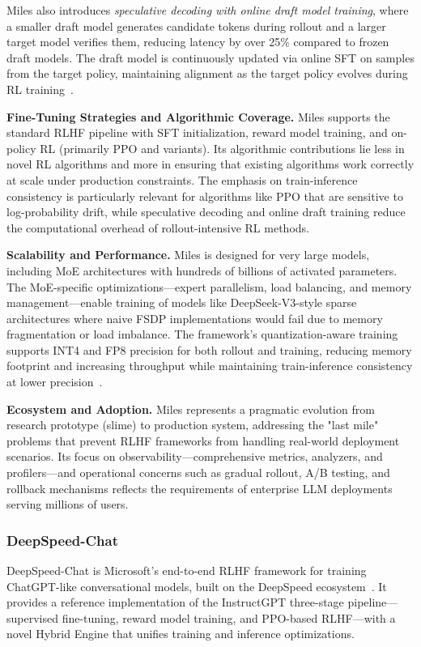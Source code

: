 \documentclass[conference]{IEEEtran}
\begin{document}
Miles also introduces \textit{speculative decoding with online draft model training}, where a smaller draft model generates candidate tokens during rollout and a larger target model verifies them, reducing latency by over 25\% compared to frozen draft models. The draft model is continuously updated via online SFT on samples from the target policy, maintaining alignment as the target policy evolves during RL training~\cite{miles-blog}.

\textbf{Fine-Tuning Strategies and Algorithmic Coverage.} Miles supports the standard RLHF pipeline with SFT initialization, reward model training, and on-policy RL (primarily PPO and variants). Its algorithmic contributions lie less in novel RL algorithms and more in ensuring that existing algorithms work correctly at scale under production constraints. The emphasis on train-inference consistency is particularly relevant for algorithms like PPO that are sensitive to log-probability drift, while speculative decoding and online draft training reduce the computational overhead of rollout-intensive RL methods.

\textbf{Scalability and Performance.} Miles is designed for very large models, including MoE architectures with hundreds of billions of activated parameters. The MoE-specific optimizations—expert parallelism, load balancing, and memory management—enable training of models like DeepSeek-V3-style sparse architectures where naive FSDP implementations would fail due to memory fragmentation or load imbalance. The framework's quantization-aware training supports INT4 and FP8 precision for both rollout and training, reducing memory footprint and increasing throughput while maintaining train-inference consistency at lower precision~\cite{miles-blog}.

\textbf{Ecosystem and Adoption.} Miles represents a pragmatic evolution from research prototype (slime) to production system, addressing the "last mile" problems that prevent RLHF frameworks from handling real-world deployment scenarios. Its focus on observability—comprehensive metrics, analyzers, and profilers—and operational concerns such as gradual rollout, A/B testing, and rollback mechanisms reflects the requirements of enterprise LLM deployments serving millions of users.


\subsubsection{DeepSpeed-Chat}

DeepSpeed-Chat is Microsoft's end-to-end RLHF framework for training ChatGPT-like conversational models, built on the DeepSpeed ecosystem~\cite{deepspeed-chat-paper, deepspeed-chat-github}. It provides a reference implementation of the InstructGPT three-stage pipeline—supervised fine-tuning, reward model training, and PPO-based RLHF—with a novel Hybrid Engine that unifies training and inference optimizations.
\end{document}
